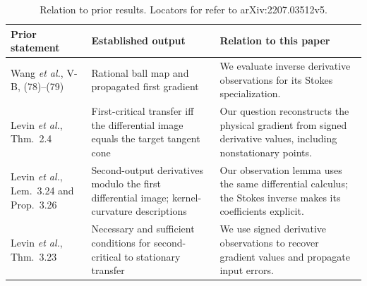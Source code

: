 \begin{table}[H]
\caption{Relation to prior results. Locators for \cite{supp-lifts} refer to arXiv:2207.03512v5.}
\label{SI-tab:priorart}
\centering\small\renewcommand{\arraystretch}{1.12}
\begin{tabularx}{\textwidth}{@{}p{}p{}X@{}}\toprule
Prior statement & Established output & Relation to this paper\\\midrule
Wang \emph{et al.}, V-B, (78)--(79) \cite{supp-gcopter} & Rational ball map and propagated first gradient & We evaluate inverse derivative observations for its Stokes specialization.\\
Levin \emph{et al.}, Thm.~2.4 \cite{supp-lifts} & First-critical transfer iff the differential image equals the target tangent cone & Our question reconstructs the physical gradient from signed derivative values, including nonstationary points.\\
Levin \emph{et al.}, Lem.~3.24 and Prop.~3.26 \cite{supp-lifts} & Second-output derivatives modulo the first differential image; kernel-curvature descriptions & Our observation lemma uses the same differential calculus; the Stokes inverse makes its coefficients explicit.\\
Levin \emph{et al.}, Thm.~3.23 \cite{supp-lifts} & Necessary and sufficient conditions for second-critical to stationary transfer & We use signed derivative observations to recover gradient values and propagate input errors.\\\bottomrule
\end{tabularx}
\end{table}


